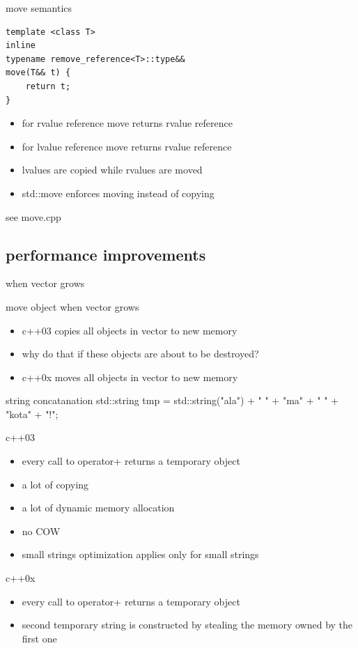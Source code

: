 \documentclass{beamer}
\begin{document}
\begin{frame}{move semantics}
\begin{verbatim}
template <class T>
inline
typename remove_reference<T>::type&&
move(T&& t) {
    return t;
}
\end{verbatim}
\begin{block}
  \begin{itemize}
  \item for rvalue reference move returns rvalue reference
  \item for lvalue reference move returns rvalue reference
  \item lvalues are copied while rvalues are moved
  \item std::move enforces moving instead of copying
  \end{itemize}
\end{block}
  see move.cpp
\end{frame}


\subsection{performance improvements}
\begin{frame}{when vector grows}
  \begin{block}{move object when vector grows}
    \begin{itemize}
    \item c++03 copies all objects in vector to new memory
    \item why do that if these objects are about to be destroyed?
    \item c++0x moves all objects in vector to new memory
    \end{itemize}
  \end{block}
\end{frame}

\begin{frame}{string concatanation}
  std::string tmp = std::string("ala") + " " + "ma" + " " + "kota" + "!";
  \begin{block}{c++03}
    \begin{itemize}
    \item every call to operator+ returns a temporary object
    \item a lot of copying
    \item a lot of dynamic memory allocation
    \item no COW
    \item small strings optimization applies only for small strings
    \end{itemize}
  \end{block}

  \begin{block}{c++0x}
    \begin{itemize}
    \item every call to operator+ returns a temporary object
    \item second temporary string is constructed by stealing the memory owned by the first one
    \end{itemize}
  \end{block}
\end{frame}
\end{document}
